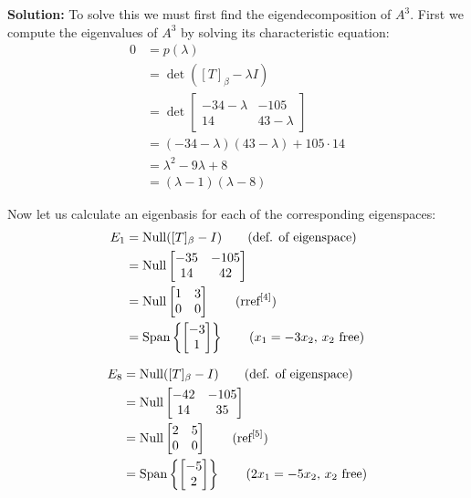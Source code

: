 \documentclass{article}
\begin{document}
\noindent\textbf{Solution:} To solve this we must first find the eigendecomposition of $A^3$. First we compute the eigenvalues of $A^3$ by solving its characteristic equation:
\begin{align*}
  0&=p(\lambda)\\
  &=\operatorname{det}([T]_\beta-\lambda I)\\
  &=\operatorname{det}\begin{bmatrix}
    -34-\lambda&-105\\14&43-\lambda
  \end{bmatrix}\\
  &=(-34-\lambda)(43-\lambda)+105\cdot14\\
  &=\lambda^2-9\lambda+8\\
  &=(\lambda-1)(\lambda-8)
\end{align*}

Now let us calculate an eigenbasis for each of the corresponding eigenspaces:
\begin{align*}
  E_1&=\operatorname{Null}([T]_\beta-I)\tag{def. of eigenspace}\\
  &=\operatorname{Null}\begin{bmatrix}
    -35&-105\\14&42
  \end{bmatrix}\\
  &=\operatorname{Null}\begin{bmatrix}
    1&3\\0&0
  \end{bmatrix}\tag{$\text{rref}^{[4]}$}\\
  &=\text{Span}\left\{\begin{bmatrix} -3\\1\end{bmatrix}\right\}\tag{$x_1=-3x_2$, $x_2$ free}
\end{align*}

\begin{align*}
  E_8&=\operatorname{Null}([T]_\beta-I)\tag{def. of eigenspace}\\
  &=\operatorname{Null}\begin{bmatrix}
    -42&-105\\14&35
  \end{bmatrix}\\
  &=\operatorname{Null}\begin{bmatrix}
    2&5\\0&0
  \end{bmatrix}\tag{$\text{ref}^{[5]}$}\\
  &=\text{Span}\left\{\begin{bmatrix} -5\\2\end{bmatrix}\right\}\tag{$2x_1=-5x_2$, $x_2$ free}
\end{align*}
\end{document}
